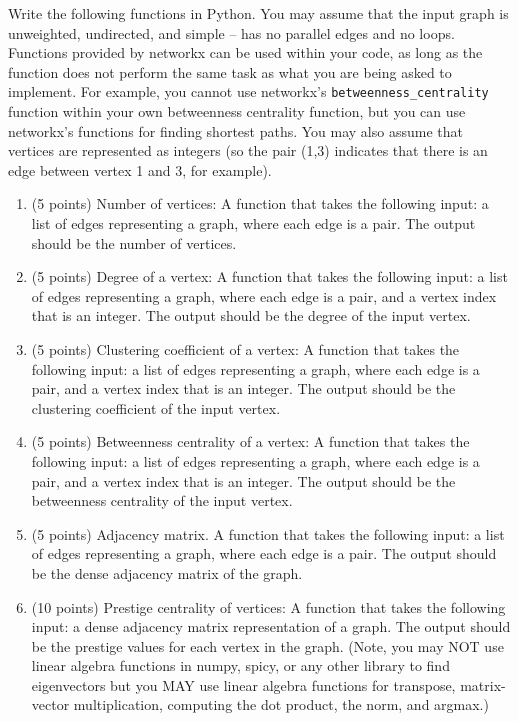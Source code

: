 \documentclass[11pt]{article}
\begin{document}
Write the following functions in Python. You may assume that the input graph is
unweighted, undirected, and simple -- has no parallel edges and no loops.
Functions provided by networkx can be used within your code, as long as the
function does not perform the same task as what you are being asked to
implement.  For example, you cannot use networkx's {\tt betweenness\_centrality}
function within your own betweenness centrality function, but you can use
networkx's functions for finding shortest paths. You may also assume that
vertices are represented as integers (so the pair (1,3) indicates that there is
an edge between vertex 1 and 3, for example).

\begin{enumerate}

    \item (5 points) Number of vertices: A function that takes the following
    input: a list of edges representing a graph, where each edge is a pair. The
    output should be the number of vertices.

    \item (5 points) Degree of a vertex: A function that takes the following
    input: a list of edges representing a graph, where each edge is a pair, and
    a vertex index that is an integer. The output should be the degree of the
    input vertex.

    \item (5 points) Clustering coefficient of a vertex: A function that takes
    the following input: a list of edges representing a graph, where each edge
    is a pair, and a vertex index that is an integer. The output should be the
    clustering coefficient of the input vertex.

    \item (5 points) Betweenness centrality of a vertex: A function that takes
    the following input: a list of edges representing a graph, where each edge
    is a pair, and a vertex index that is an integer. The output should be the
    betweenness centrality of the input vertex.

    \item (5 points) Adjacency matrix. A function that takes the following
    input: a list of edges representing a graph, where each edge is a pair. The
    output should be the dense adjacency matrix of the graph.

    \item (10 points) Prestige centrality of vertices: A function that takes the
    following input: a dense adjacency matrix representation of a graph.  The
    output should be the prestige values for each vertex in the graph.
    (Note, you may NOT use linear algebra functions in numpy, spicy, or any
    other library to find eigenvectors but you MAY use linear algebra functions
    for transpose, matrix-vector multiplication,
    computing the dot product, the norm, and argmax.)
\end{enumerate}
\end{document}
